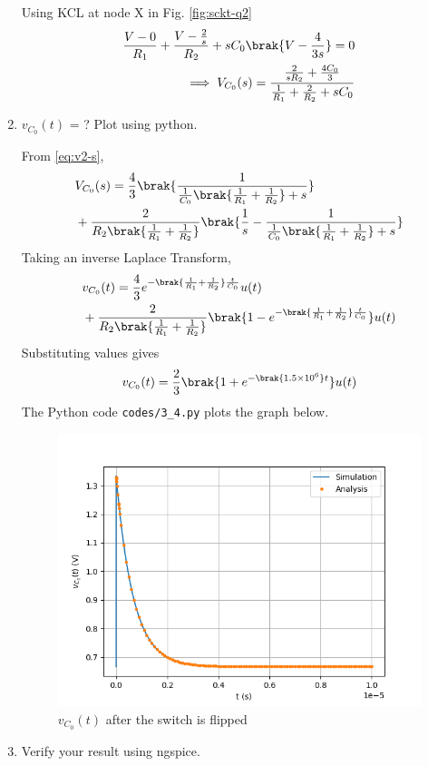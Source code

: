 \documentclass[journal,12pt,twocolumn]{IEEEtran}
\renewcommand\thesection{\arabic{section}}
\begin{document}
\begin{enumerate}[label=\arabic*.,ref=\thesection.\theenumi]
		\solution Using KCL at node X in Fig. \ref{fig:sckt-q2}
		\begin{align}
			\frac{V - 0}{R_1} + \frac{V - \frac{2}{s}}{R_2} + sC_0\brak{V - \frac{4}{3s}} = 0 \\
			\implies V_{C_0}(s) = \frac{\frac{2}{sR_2} + \frac{4C_0}{3}}{\frac{1}{R_1} + \frac{2}{R_2} + sC_0}
			\label{eq:v2-s}
		\end{align}
		\item $v_{C_0}(t)$ = ? Plot using python.
		
		\solution From \eqref{eq:v2-s},
		\begin{align}
			&V_{C_0}(s) = \frac{4}{3}\brak{\frac{1}{\frac{1}{C_0}\brak{\frac{1}{R_1} + \frac{1}{R_2}}+s}} \nonumber \\
			&+ \frac{2}{R_2\brak{\frac{1}{R_1} +\frac{1}{R_2}}}\brak{\frac{1}{s} - \frac{1}{\frac{1}{C_0}\brak{\frac{1}{R_1} + \frac{1}{R_2}} + s}}
		\end{align}
		Taking an inverse Laplace Transform,
		\begin{align}
			&v_{C_0}(t) = \frac{4}{3}e^{-\brak{\frac{1}{R_1} + \frac{1}{R_2}}\frac{t}{C_0}}u(t) \nonumber \\ 
			&+ \frac{2}{R_2\brak{\frac{1}{R_1}+\frac{1}{R_2}}}\brak{1 - e^{-\brak{\frac{1}{R_1} + \frac{1}{R_2}}\frac{t}{C_0}}}u(t)
		\end{align}
		Substituting values gives
		\begin{align}
			v_{C_0}(t) = \frac{2}{3}\brak{1 +e^{-\brak{1.5 \times 10^6}t}}u(t)
			\label{eq:v2-t}
		\end{align}
		The Python code \texttt{codes/3\_4.py} plots the graph below.
		\begin{figure}[!htb]
			\includegraphics[width=\columnwidth]{figs/3_4.png}
			\caption{$v_{C_0}(t)$ after the switch is flipped}
			\label{fig:v2-t}
		\end{figure}
		\item Verify your result using ngspice.
		

\end{enumerate}
\end{document}
